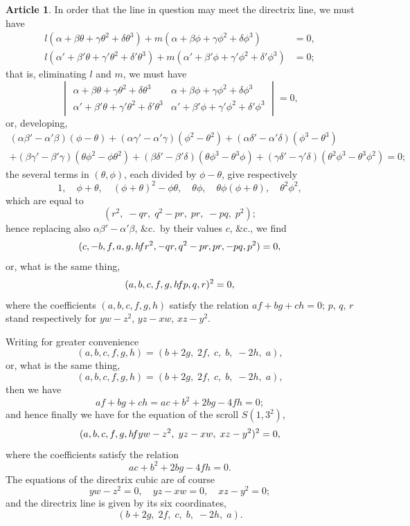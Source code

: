 \documentclass[12pt,a4paper]{article}
\theoremstyle{definition}
\newtheorem{art}{Article}[section]
\begin{document}
\begin{art}
In order that the line in question may meet the directrix line, we must have
\begin{align*}
l(\alpha + \beta\theta + \gamma\theta^2 + \delta\theta^3) + m(\alpha + \beta\phi + \gamma\phi^2 + \delta\phi^3) &= 0, \\
l(\alpha' + \beta'\theta + \gamma'\theta^2 + \delta'\theta^3) + m(\alpha' + \beta'\phi + \gamma'\phi^2 + \delta'\phi^3) &= 0;
\end{align*}
that is, eliminating $l$ and $m$, we must have
\[
\begin{vmatrix}
\alpha + \beta\theta + \gamma\theta^2 + \delta\theta^3 & \alpha + \beta\phi + \gamma\phi^2 + \delta\phi^3 \\
\alpha' + \beta'\theta + \gamma'\theta^2 + \delta'\theta^3 & \alpha' + \beta'\phi + \gamma'\phi^2 + \delta'\phi^3
\end{vmatrix} = 0,
\]
or, developing,
\begin{multline*}
(\alpha\beta' - \alpha'\beta)(\phi - \theta) + (\alpha\gamma' - \alpha'\gamma)(\phi^2 - \theta^2) + (\alpha\delta' - \alpha'\delta)(\phi^3 - \theta^3) \\
+ (\beta\gamma' - \beta'\gamma)(\theta\phi^2 - \phi\theta^2) + (\beta\delta' - \beta'\delta)(\theta\phi^3 - \theta^3\phi) + (\gamma\delta' - \gamma'\delta)(\theta^2\phi^3 - \theta^3\phi^2) = 0;
\end{multline*}
the several terms in $(\theta, \phi)$, each divided by $\phi - \theta$, give respectively
\[
1, \quad \phi + \theta, \quad (\phi + \theta)^2 - \phi\theta, \quad \theta\phi, \quad \theta\phi(\phi + \theta), \quad \theta^2\phi^2,
\]
which are equal to
\[
(r^2, \; -qr, \; q^2 - pr, \; pr, \; -pq, \; p^2);
\]
hence replacing also $\alpha\beta' - \alpha'\beta$, \&c.\ by their values $c$, \&c., we find
\[
(c, -b, f, a, g, h \hspace{-2pt} fr^2, -qr, q^2 - pr, pr, -pq, p^2) = 0,
\]
or, what is the same thing,
\[
(a, b, c, f, g, h \hspace{-2pt} fp, q, r)^2 = 0,
\]
where the coefficients $(a, b, c, f, g, h)$ satisfy the relation $af + bg + ch = 0$; $p$, $q$, $r$ stand respectively for $yw - z^2$, $yz - xw$, $xz - y^2$.

Writing for greater convenience
\[
(a, b, c, f, g, h) = (b + 2g, \; 2f, \; c, \; b, \; -2h, \; a),
\]
or, what is the same thing,
\[
(a, b, c, f, g, h) = (b + 2g, \; 2f, \; c, \; b, \; -2h, \; a),
\]
then we have
\[
af + bg + ch = ac + b^2 + 2bg - 4fh = 0;
\]
and hence finally we have for the equation of the scroll $S(1, 3^2)$,
\[
(a, b, c, f, g, h \hspace{-2pt} fyw - z^2, \; yz - xw, \; xz - y^2)^2 = 0,
\]
where the coefficients satisfy the relation
\[
ac + b^2 + 2bg - 4fh = 0.
\]
The equations of the directrix cubic are of course
\[
yw - z^2 = 0, \quad yz - xw = 0, \quad xz - y^2 = 0;
\]
and the directrix line is given by its six coordinates,
\[
(b + 2g, \; 2f, \; c, \; b, \; -2h, \; a).
\]
\end{art}
\end{document}
